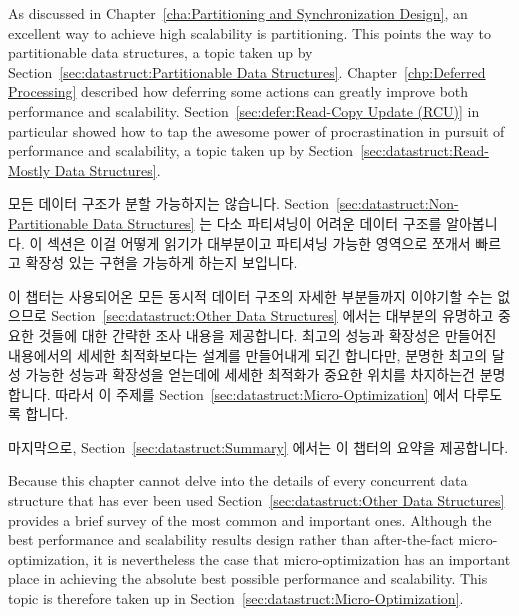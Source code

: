 As discussed in Chapter~\ref{cha:Partitioning and Synchronization Design},
an excellent way to achieve high scalability is partitioning.
This points the way to partitionable data structures, a topic taken up by
Section~\ref{sec:datastruct:Partitionable Data Structures}.
Chapter~\ref{chp:Deferred Processing} described how deferring some
actions can greatly improve both performance and scalability.
Section~\ref{sec:defer:Read-Copy Update (RCU)} in particular showed
how to tap the awesome power of procrastination in pursuit of
performance and scalability, a topic taken up by
Section~\ref{sec:datastruct:Read-Mostly Data Structures}.
\fi

모든 데이터 구조가 분할 가능하지는 않습니다.
Section~\ref{sec:datastruct:Non-Partitionable Data Structures} 는 다소
파티셔닝이 어려운 데이터 구조를 알아봅니다.
이 섹션은 이걸 어떻게 읽기가 대부분이고 파티셔닝 가능한 영역으로 쪼개서 빠르고
확장성 있는 구현을 가능하게 하는지 보입니다.

이 챕터는 사용되어온 모든 동시적 데이터 구조의 자세한 부분들까지 이야기할 수는
없으므로
Section~\ref{sec:datastruct:Other Data Structures} 에서는 대부분의 유명하고
중요한 것들에 대한 간략한 조사 내용을 제공합니다.
최고의 성능과 확장성은 만들어진 내용에서의 세세한 최적화보다는 설계를
만들어내게 되긴 합니다만, 분명한 최고의 달성 가능한 성능과 확장성을 얻는데에
세세한 최적화가 중요한 위치를 차지하는건 분명합니다.
따라서 이 주제를
Section~\ref{sec:datastruct:Micro-Optimization} 에서 다루도록 합니다.

마지막으로, Section~\ref{sec:datastruct:Summary} 에서는 이 챕터의 요약을
제공합니다.
\iffalse

Because this chapter cannot delve into the details of every concurrent
data structure that has ever been used
Section~\ref{sec:datastruct:Other Data Structures}
provides a brief survey of the most common and important ones.
Although the best performance and scalability results design rather
than after-the-fact micro-optimization, it is nevertheless the case
that micro-optimization has an important place in achieving the
absolute best possible performance and scalability.
This topic is therefore taken up in
Section~\ref{sec:datastruct:Micro-Optimization}.

